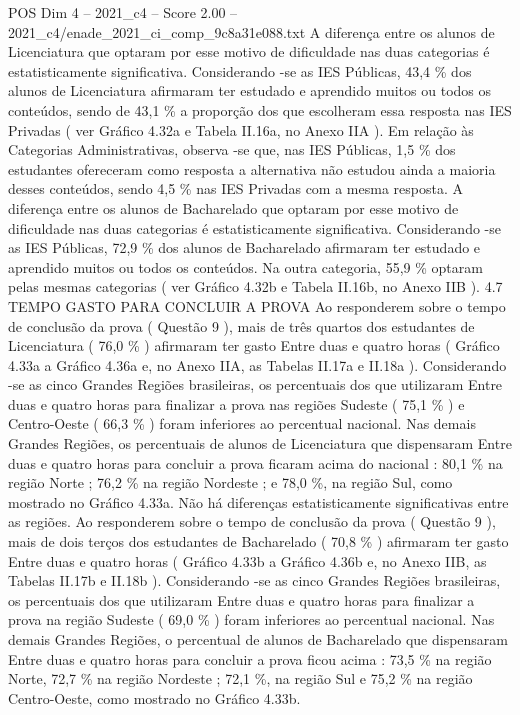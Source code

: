 \begin{textsample}{POS Dim 4 – 2021\_c4 – Score 2.00 – 2021\_c4/enade\_2021\_ci\_comp\_9c8a31e088.txt}
A diferença entre os alunos de Licenciatura que optaram por esse motivo de dificuldade nas duas categorias é estatisticamente significativa.
Considerando -se as IES Públicas, 43,4 \% dos alunos de Licenciatura afirmaram ter estudado e aprendido muitos ou todos os conteúdos, sendo de 43,1 \% a proporção dos que escolheram essa resposta nas IES Privadas ( ver Gráfico 4.32a e Tabela II.16a, no Anexo IIA ).
Em relação às Categorias Administrativas, observa -se que, nas IES Públicas, 1,5 \% dos estudantes ofereceram como resposta a alternativa não estudou ainda a maioria desses conteúdos, sendo 4,5 \% nas IES Privadas com a mesma resposta.
A diferença entre os alunos de Bacharelado que optaram por esse motivo de dificuldade nas duas categorias é estatisticamente significativa.
Considerando -se as IES Públicas, 72,9 \% dos alunos de Bacharelado afirmaram ter estudado e aprendido muitos ou todos os conteúdos.
Na outra categoria, 55,9 \% optaram pelas mesmas categorias ( ver Gráfico 4.32b e Tabela II.16b, no Anexo IIB ). 4.7 TEMPO GASTO PARA CONCLUIR A PROVA Ao responderem sobre o tempo de conclusão da prova ( Questão 9 ), mais de três quartos dos estudantes de Licenciatura ( 76,0 \% ) afirmaram ter gasto Entre duas e quatro horas ( Gráfico 4.33a a Gráfico 4.36a e, no Anexo IIA, as Tabelas II.17a e II.18a ).
Considerando -se as cinco Grandes Regiões brasileiras, os percentuais dos que utilizaram Entre duas e quatro horas para finalizar a prova nas regiões Sudeste ( 75,1 \% ) e Centro-Oeste ( 66,3 \% ) foram inferiores ao percentual nacional.
Nas demais Grandes Regiões, os percentuais de alunos de Licenciatura que dispensaram Entre duas e quatro horas para concluir a prova ficaram acima do nacional : 80,1 \% na região Norte ; 76,2 \% na região Nordeste ; e 78,0 \%, na região Sul, como mostrado no Gráfico 4.33a.
Não há diferenças estatisticamente significativas entre as regiões.
Ao responderem sobre o tempo de conclusão da prova ( Questão 9 ), mais de dois terços dos estudantes de Bacharelado ( 70,8 \% ) afirmaram ter gasto Entre duas e quatro horas ( Gráfico 4.33b a Gráfico 4.36b e, no Anexo IIB, as Tabelas II.17b e II.18b ).
Considerando -se as cinco Grandes Regiões brasileiras, os percentuais dos que utilizaram Entre duas e quatro horas para finalizar a prova na região Sudeste ( 69,0 \% ) foram inferiores ao percentual nacional.
Nas demais Grandes Regiões, o percentual de alunos de Bacharelado que dispensaram Entre duas e quatro horas para concluir a prova ficou acima : 73,5 \% na região Norte, 72,7 \% na região Nordeste ; 72,1 \%, na região Sul e 75,2 \% na região Centro-Oeste, como mostrado no Gráfico 4.33b.

\end{textsample}

